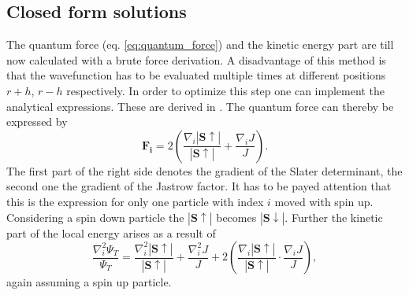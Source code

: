 \subsection{Closed form solutions}
The quantum force (eq. \ref{eq:quantum_force}) and the kinetic energy part  are till now calculated with a brute force derivation. A disadvantage of this method is that the wavefunction has to be evaluated multiple times at different positions $r+h$, $r-h$ respectively. In order to optimize this step one can implement the analytical expressions. These are derived in \citet{hogberget2013}. The quantum force can thereby be expressed by
\begin{equation}
\mathbf{F_i} = 2 \left( \frac{\nabla_i |\mathbf{S\uparrow}|}{|\mathbf{S\uparrow}|} + \frac{\nabla_i J}{J} \right).
\end{equation}
The first part of the right side denotes the gradient of the Slater determinant, the second one the gradient of the Jastrow factor. It has to be payed attention that this is the expression for only one particle with index $i$ moved with spin up. Considering a spin down particle the $|\mathbf{S\uparrow}|$ becomes $|\mathbf{S\downarrow}|$. Further the kinetic part of the local energy arises as a result of
\begin{equation}
\frac{\nabla_i^2 \Psi_T}{\Psi_T} = \frac{\nabla_i^2 |\mathbf{S\uparrow}|}{|\mathbf{S\uparrow}|} + \frac{\nabla_i^2 J}{J} + 2\left( \frac{\nabla_i |\mathbf{S\uparrow}|}{|\mathbf{S\uparrow}|} \cdot \frac{\nabla_i J}{J} \right),
\end{equation}
again assuming a spin up particle.

